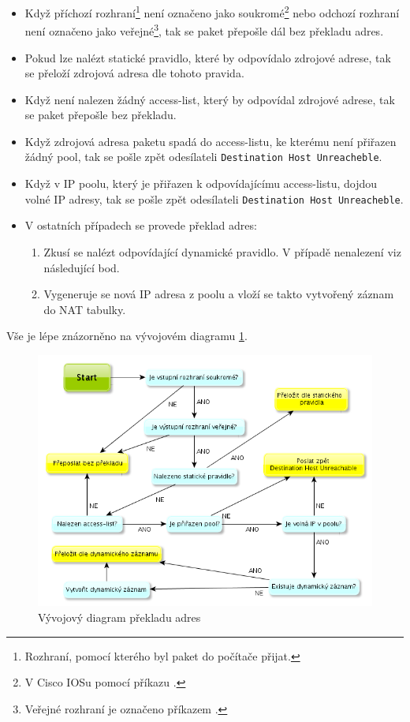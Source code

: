 \begin{itemize}
\item Když příchozí rozhraní\footnote{Rozhraní, pomocí kterého byl paket do počítače přijat.} není označeno jako soukromé\footnote{V Cisco IOSu pomocí příkazu .} nebo odchozí rozhraní není označeno jako veřejné\footnote{Veřejné rozhraní je označeno příkazem .}, tak se paket přepošle dál bez překladu adres.

\item Pokud lze nalézt statické pravidlo, které by odpovídalo zdrojové adrese, tak se přeloží zdrojová adresa dle tohoto pravida.

\item Když není nalezen žádný access-list, který by odpovídal zdrojové adrese, tak se paket přepošle bez překladu.

\item Když zdrojová adresa paketu spadá do access-listu, ke kterému není přiřazen žádný pool, tak se pošle zpět odesílateli \verb|Destination Host Unreacheble|.

\item Když v IP poolu, který je přiřazen k odpovídajícímu access-listu, dojdou volné IP adresy, tak se pošle zpět odesílateli \verb|Destination Host Unreacheble|.

\item V ostatních případech se provede překlad adres:
    \begin{enumerate}
    \item Zkusí se nalézt odpovídající dynamické pravidlo. V případě nenalezení viz následující bod.
    \item Vygeneruje se nová IP adresa z poolu a vloží se takto vytvořený záznam do NAT tabulky.
    \end{enumerate}
\end{itemize}

Vše je lépe znázorněno na vývojovém diagramu \ref{fig:nat_decision}.

\begin{figure}[b]
\begin{center}
\includegraphics[width=16cm]{figures/nat_decision}
\caption{Vývojový diagram překladu adres}
\label{fig:nat_decision}
\end{center}
\end{figure}

